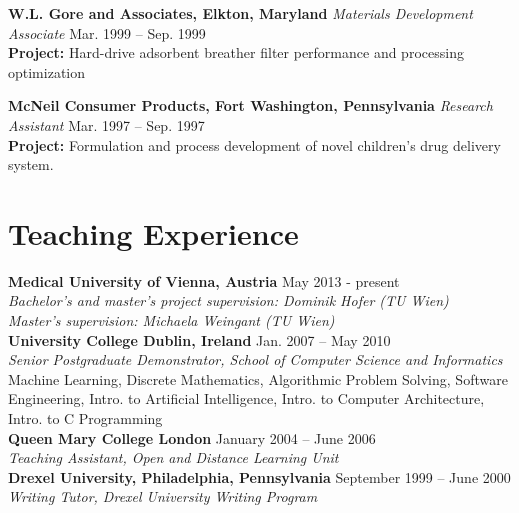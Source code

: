 \documentclass[line,a4paper]{resume}
\begin{document}
\begin{resume}
\begin{minipage}{\textwidth}
	    \textbf{W.L. Gore and Associates, Elkton, Maryland} \textsl{Materials Development Associate} \hfill Mar. 1999 -- Sep. 1999 \\
		\textbf{Project:} Hard-drive adsorbent breather filter performance and processing optimization \vspace{1mm}\\%
	\end{minipage}
	\begin{minipage}{\textwidth}
		   \textbf{McNeil Consumer Products, Fort Washington, Pennsylvania} \textsl{Research Assistant} \hfill Mar. 1997 -- Sep. 1997 \\
		\textbf{Project: }Formulation and process development of novel children's drug delivery system.\\%
	\end{minipage}

	\section{\mysidestyle Teaching Experience}\vspace{1mm}
    \textbf{Medical University of Vienna, Austria} \hfill May 2013 - present \\
    \textsl{Bachelor's and master's project supervision: Dominik Hofer (TU Wien)} \\
    \textsl{Master's supervision: Michaela Weingant (TU Wien)} \vspace{1mm}\\%
    \textbf{University College Dublin, Ireland} \hfill Jan. 2007 -- May 2010\\
    \textsl{Senior Postgraduate Demonstrator, School of Computer Science and Informatics} \\
     Machine Learning, Discrete Mathematics, Algorithmic Problem Solving, Software Engineering, Intro. to Artificial Intelligence, Intro. to Computer Architecture, Intro. to C Programming \vspace{1mm}\\%
    \textbf{Queen Mary College London} \hfill January 2004 -- June 2006\\
    \textsl{Teaching Assistant, Open and Distance Learning Unit} \vspace{1mm}\\%
    \textbf{Drexel University, Philadelphia, Pennsylvania} \hfill September 1999 -- June 2000\\
    \textsl{Writing Tutor, Drexel University Writing Program}


\end{resume}
\end{document}
